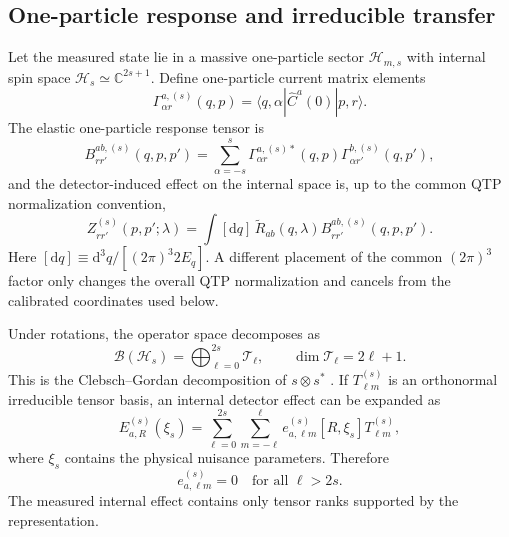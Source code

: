 \documentclass[12pt]{iopjournal}
\newcommand{\Hs}{\mathcal H_s}
\newcommand{\Tcal}{\mathcal T}
\newcommand{\dd}{\mathrm d}
\theoremstyle{definition}
\theoremstyle{remark}
\begin{document}
\subsection{One-particle response and irreducible transfer}

Let the measured state lie in a massive one-particle sector $\mathcal H_{m,s}$ with internal spin space $\Hs\simeq\mathbb C^{2s+1}$. Define one-particle current matrix elements
\begin{equation}
\Gamma^{a,(s)}_{\alpha r}(q,p)=\langle q,\alpha|\hat C^a(0)|p,r\rangle.
\end{equation}
The elastic one-particle response tensor is
\begin{equation}
B^{ab,(s)}_{rr'}(q,p,p')=
\sum_{\alpha=-s}^{s}
\Gamma^{a,(s)*}_{\alpha r}(q,p)
\Gamma^{b,(s)}_{\alpha r'}(q,p'),
\label{eq:response-tensor}
\end{equation}
and the detector-induced effect on the internal space is, up to the common QTP normalization convention,
\begin{equation}
Z^{(s)}_{rr'}(p,p';\lambda)=
\int[\dd q]\,
\widetilde R_{ab}(q,\lambda)B^{ab,(s)}_{rr'}(q,p,p').
\label{eq:qtp-effect}
\end{equation}
Here $[\dd q]\equiv\dd^3q/[(2\pi)^3 2E_q]$.  A different placement of the common $(2\pi)^3$ factor only changes the overall QTP normalization and cancels from the calibrated coordinates used below.

Under rotations, the operator space decomposes as
\begin{equation}
\mathcal B(\Hs)=\bigoplus_{\ell=0}^{2s}\Tcal_\ell,
\qquad
\dim\Tcal_\ell=2\ell+1.
\label{eq:operator-decomposition}
\end{equation}
This is the Clebsch--Gordan decomposition of $s\otimes s^*$ \cite{CotognoLorceLowdonMorales2020}. If $T^{(s)}_{\ell m}$ is an orthonormal irreducible tensor basis, an internal detector effect can be expanded as
\begin{equation}
E^{(s)}_{a,R}(\xi_s)
=
\sum_{\ell=0}^{2s}\sum_{m=-\ell}^{\ell}
 e^{(s)}_{a,\ell m}[R,\xi_s]T^{(s)}_{\ell m},
\end{equation}
where $\xi_s$ contains the physical nuisance parameters. Therefore
\begin{equation}
\boxed{e^{(s)}_{a,\ell m}=0\quad\text{for all }\ell>2s.}
\label{eq:representation-zero}
\end{equation}
The measured internal effect contains only tensor ranks supported by the representation.
\end{document}
